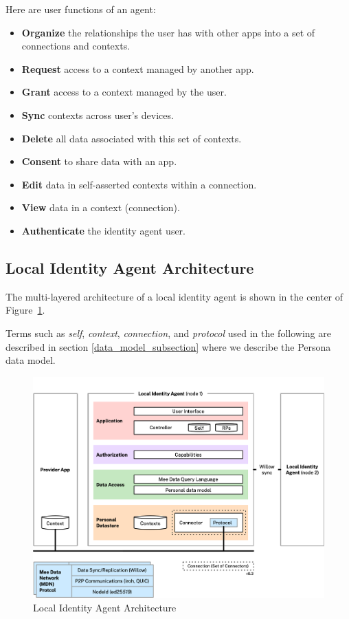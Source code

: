 \documentclass[11pt, oneside]{article}   	%
\begin{document}
Here are user functions of an agent:

\begin{itemize}
\item \textbf{Organize} the relationships the user has with other apps into a set of connections and contexts.
\item \textbf{Request} access to a context managed by another app.
\item \textbf{Grant} access to a context managed by the user.
\item \textbf{Sync} contexts across user's devices.
\item \textbf{Delete} all data associated with this set of contexts.
\item \textbf{Consent} to share data with an app.
\item \textbf{Edit} data in self-asserted contexts within a connection.
\item \textbf{View} data in a context (connection).
\item \textbf{Authenticate} the identity agent user.
\end{itemize}

\subsection{Local Identity Agent Architecture}

The multi-layered architecture of a local identity agent is shown in the center of Figure~\ref{fig:architecture}. 

Terms such as \emph{self}, \emph{context}, \emph{connection}, and \emph{protocol} used in the following are described in section \ref{data_model_subsection} where we describe the Persona data model.

\begin{figure}[htbp]
\includegraphics[width=\textwidth]{./images/architecture.png}
\caption{Local Identity Agent Architecture}
\label{fig:architecture}
\end{figure}
\end{document}
